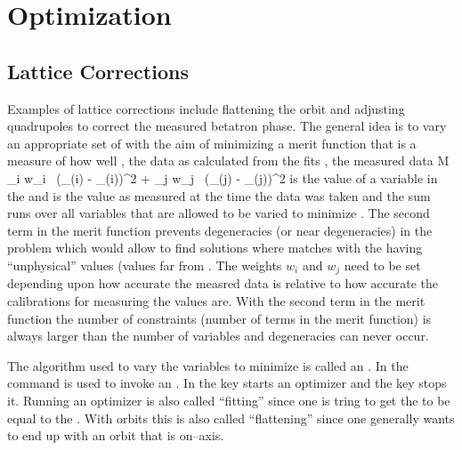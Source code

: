 \chapter{Optimization}
\label{c:opti}

\section{Lattice Corrections}

Examples of lattice corrections include flattening the orbit and
adjusting quadrupoles to correct the measured betatron phase. The
general idea is to vary an appropriate set of  with the
aim of minimizing a merit function  that is a measure of how
well , the data as calculated from the  fits
, the measured data
\Begineq
  {\cal M} \equiv \sum_{i} w_i \,
    (\data\_\model(i) -  \data\_\meas(i))^2 + 
  \sum_{j} w_j \,
    (\var\_\model(j) - \var\_\meas(j))^2
  \label{m1}
\Endeq
{} is the value of a variable in the  and
 is the value as measured at the time the data was taken
and the sum  runs over all variables that are allowed to be
varied to minimize . The second term in the merit function
prevents degeneracies (or near degeneracies) in the problem which
would allow \tao to find solutions where  matches
 with the  having ``unphysical''
values (values far from . The weights $w_i$ and $w_j$
need to be set depending upon how accurate the measred data is
relative to how accurate the calibrations for measuring the
 values are. With the second term in the merit function
the number of constraints (number of terms in the merit function) is
always larger than the number of variables and degeneracies can never
occur. 

The algorithm used to vary the  variables to minimize
 is called an . In  the
 command is used to invoke an . In  the  key starts an optimizer and the  key stops it.
Running an optimizer is also called ``fitting'' since one is tring to
get the  to be equal to the . With orbits
this is also called ``flattening'' since one generally wants to end up
with an orbit that is on--axis.

